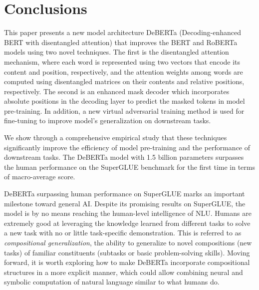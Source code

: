 \section{Conclusions}
\label{sec:conclusion}

This paper presents a new model architecture DeBERTa (Decoding-enhanced BERT with disentangled attention) that improves the BERT and RoBERTa models using two novel techniques. 
The first is the disentangled attention mechanism, where
each word is represented using two vectors that encode its content and position, respectively, and the attention weights among words are computed using disentangled matrices on their contents and relative positions, respectively. 
The second is an enhanced mask decoder which incorporates absolute positions in the decoding layer to predict the masked tokens in model pre-training. 
In addition, a new virtual adversarial training method is used for fine-tuning to improve model's generalization on downstream tasks.

We show through a comprehensive empirical study that these techniques significantly improve the efficiency of model pre-training and the performance of downstream tasks. 
The DeBERTa model with 1.5 billion parameters surpasses the human
performance on the SuperGLUE benchmark for the first time
in terms of macro-average score.

DeBERTa surpassing human performance on SuperGLUE marks an important milestone toward general AI. Despite its promising results on SuperGLUE, the model is by no means reaching the human-level intelligence of NLU. Humans are extremely good at leveraging the knowledge learned from different tasks to solve a new task with no or little task-specific demonstration. This is referred to as \emph{compositional generalization}, the ability to generalize to novel compositions (new tasks) of familiar constituents (subtasks or basic problem-solving skills). Moving forward, it is worth exploring how to make DeBERTa incorporate compositional structures in a more explicit manner, which could allow combining neural and symbolic computation of natural language similar to what humans do.



